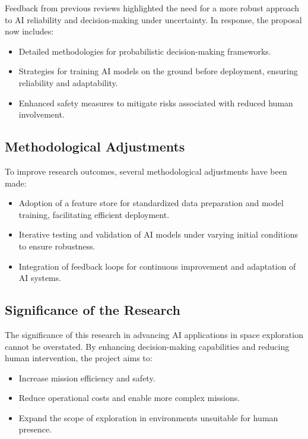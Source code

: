 \documentclass[a4paper, 11pt]{article}
\begin{document}
Feedback from previous reviews highlighted the need for a more robust approach to AI reliability and decision-making under uncertainty. In response, the proposal now includes:

\begin{itemize}
    \item Detailed methodologies for probabilistic decision-making frameworks.
    \item Strategies for training AI models on the ground before deployment, ensuring reliability and adaptability.
    \item Enhanced safety measures to mitigate risks associated with reduced human involvement.
\end{itemize}

\subsection{Methodological Adjustments}

To improve research outcomes, several methodological adjustments have been made:

\begin{itemize}
    \item Adoption of a feature store for standardized data preparation and model training, facilitating efficient deployment.
    \item Iterative testing and validation of AI models under varying initial conditions to ensure robustness.
    \item Integration of feedback loops for continuous improvement and adaptation of AI systems.
\end{itemize}

\subsection{Significance of the Research}

The significance of this research in advancing AI applications in space exploration cannot be overstated. By enhancing decision-making capabilities and reducing human intervention, the project aims to:

\begin{itemize}
    \item Increase mission efficiency and safety.
    \item Reduce operational costs and enable more complex missions.
    \item Expand the scope of exploration in environments unsuitable for human presence.
\end{itemize}
\end{document}
